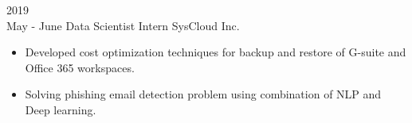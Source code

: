 \documentclass[9pt]{developercv} %
\begin{document}
\begin{entrylist}
{\begin{itemize}[noitemsep,topsep=0pt,parsep=0pt,partopsep=0pt, leftmargin=-1pt]
        \end{itemize}
    }
    \entry
    {2019\\\footnotesize{May - June}}
    {Data Scientist Intern}
    {SysCloud Inc.}
    {\vspace{-7pt}
    \small
        \begin{itemize}[noitemsep,topsep=0pt,parsep=0pt,partopsep=0pt, leftmargin=-1pt]
            \item Developed cost optimization techniques for backup and restore of G-suite and Office 365 workspaces.
            \item Solving phishing email detection problem using combination of NLP and Deep learning.
        \end{itemize}
    }
\end{entrylist}



\vspace{-15 pt}
\end{document}
